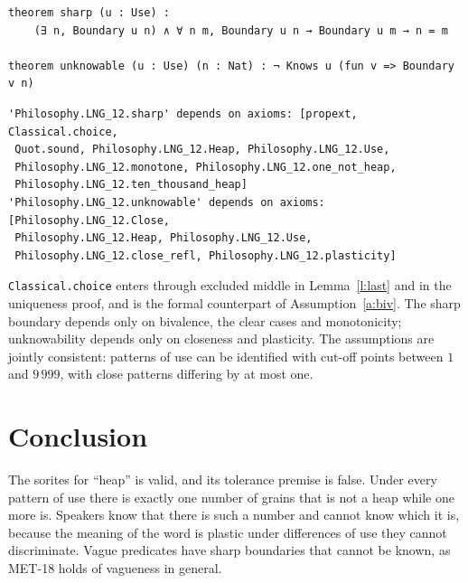\documentclass{situationist-preprint}
\begin{document}
\begin{lstlisting}
theorem sharp (u : Use) :
    (∃ n, Boundary u n) ∧ ∀ n m, Boundary u n → Boundary u m → n = m

theorem unknowable (u : Use) (n : Nat) : ¬ Knows u (fun v => Boundary v n)
\end{lstlisting}

\begin{lstlisting}
'Philosophy.LNG_12.sharp' depends on axioms: [propext, Classical.choice,
 Quot.sound, Philosophy.LNG_12.Heap, Philosophy.LNG_12.Use,
 Philosophy.LNG_12.monotone, Philosophy.LNG_12.one_not_heap,
 Philosophy.LNG_12.ten_thousand_heap]
'Philosophy.LNG_12.unknowable' depends on axioms: [Philosophy.LNG_12.Close,
 Philosophy.LNG_12.Heap, Philosophy.LNG_12.Use,
 Philosophy.LNG_12.close_refl, Philosophy.LNG_12.plasticity]
\end{lstlisting}

\texttt{Classical.choice} enters through excluded middle in Lemma~\ref{l:last} and in the uniqueness proof, and is the formal counterpart of Assumption~\ref{a:biv}. The sharp boundary depends only on bivalence, the clear cases and monotonicity; unknowability depends only on closeness and plasticity. The assumptions are jointly consistent: patterns of use can be identified with cut-off points between $1$ and $9\,999$, with close patterns differing by at most one.

\section{Conclusion}

The sorites for \enquote{heap} is valid, and its tolerance premise is false. Under every pattern of use there is exactly one number of grains that is not a heap while one more is. Speakers know that there is such a number and cannot know which it is, because the meaning of the word is plastic under differences of use they cannot discriminate. Vague predicates have sharp boundaries that cannot be known, as MET-18 holds of vagueness in general.
\end{document}
